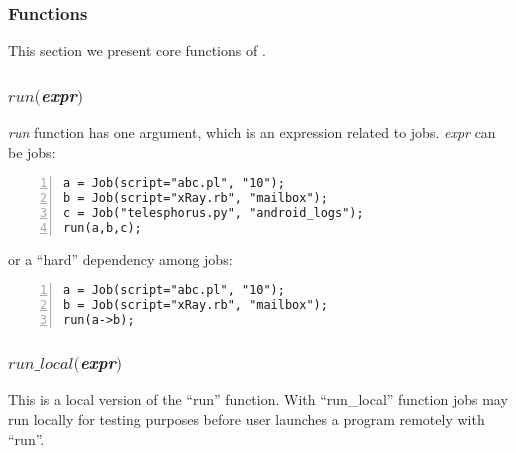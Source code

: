 
\subsubsection*{\lang{} Functions}

This section we present core functions of \lang{}.
\subsubsection*{$run($\textit{expr}$)$}
\textit{run} function has one argument, which is an expression related to jobs.
\textit{expr} can be jobs:
\begin{Verbatim}[numbers=left]
a = Job(script="abc.pl", "10");
b = Job(script="xRay.rb", "mailbox");
c = Job("telesphorus.py", "android_logs");
run(a,b,c);
\end{Verbatim}

or a ``hard'' dependency among jobs:
\begin{Verbatim}[numbers=left]
a = Job(script="abc.pl", "10");
b = Job(script="xRay.rb", "mailbox");
run(a->b);
\end{Verbatim}
\subsubsection*{$run\_local($\textit{expr}$)$}
This is a local version of the ``run'' function.
With ``run\_local'' function jobs may run locally for testing purposes before
user launches a program remotely with ``run''.

